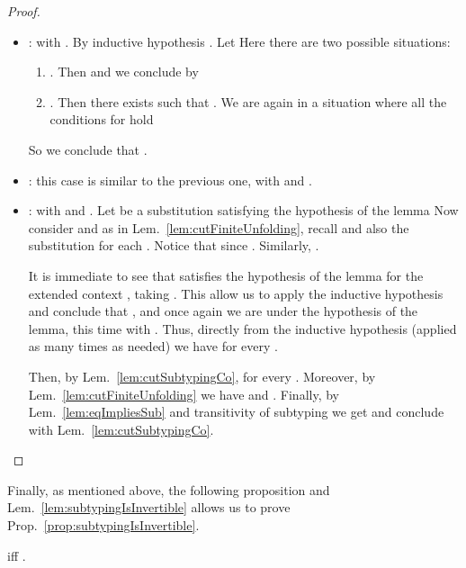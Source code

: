 \begin{proof}
\begin{itemize}
  \item :  with . By inductive hypothesis . Let 
Here there are two possible situations:
  \begin{enumerate}
    \item . Then  and we conclude by
     
    \item . Then there exists  such that . We are again in a situation where all the
    conditions for  hold 
  \end{enumerate}
  So we conclude that .
  
  \item : this case is similar to the previous one, with
   and .
  
  \item :  with
   and . Let  be a substitution satisfying the hypothesis of
  the lemma 
  Now consider  and  as in
  Lem.~\ref{lem:cutFiniteUnfolding}, recall  and also the substitution  for each . Notice that
   since . Similarly,
  .
  
  It is immediate to see that  satisfies the hypothesis of the lemma
  for the extended context , taking . This
  allow us to apply the inductive hypothesis and conclude that
  , and once again we
  are under the hypothesis of the lemma, this time with . Thus,
  directly from the inductive hypothesis (applied as many times as needed) we
  have  for every .
  
  Then, by Lem.~\ref{lem:cutSubtypingCo},
   for every .
  Moreover, by Lem.~\ref{lem:cutFiniteUnfolding} we have
   and
  . Finally, by Lem.~\ref{lem:eqImpliesSub} and transitivity of
  subtyping we get  and conclude with Lem.~\ref{lem:cutSubtypingCo}.
\end{itemize}
\end{proof}



Finally, as mentioned above, the following proposition and
Lem.~\ref{lem:subtypingIsInvertible} allows us to prove
Prop.~\ref{prop:subtypingIsInvertible}.

\begin{proposition}
\label{prop:subtypeSoundnessAndCompleteness}
 iff .
\end{proposition}


